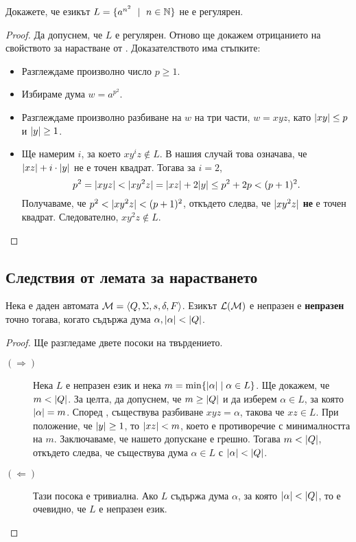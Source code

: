 \begin{problem}
  Докажете, че езикът $L = \{a^{n^2}\ \mid\ n\in\Nat\}$ не е регулярен.  
\end{problem}
\begin{proof}
  Да допуснем, че $L$ е регулярен. Отново ще докажем отрицанието на свойството за нарастване от .
  Доказателството има стъпките:
  \begin{itemize}
  \item 
    Разглеждаме произволно число $p \geq 1$.
  \item
    Избираме дума $w = a^{p^2}$.
  \item
    Разглеждаме произволно разбиване на $w$ на три части, $w = xyz$, 
    като $\lvert{xy}\rvert \leq p$ и $\lvert{y}\rvert \geq 1$.
  \item
    Ще намерим $i$, за което $xy^iz \not\in L$.
    В нашия случай това означава, че $\lvert{xz}\rvert + i\cdot\lvert{y}\rvert$ не е точен квадрат.
    Тогава за $i = 2$,
    \[p^2 = \lvert{xyz}\rvert < \lvert{xy^2z}\rvert = \lvert{xz}\rvert + 2\lvert{y}\rvert \leq p^2 + 2p < (p+1)^2 .\]
    Получаваме, че $p^2 < \lvert{xy^2z}\rvert < (p+1)^2$,
    откъдето следва, че $\lvert{xy^2z}\rvert$ {\bf не} е точен квадрат.    
    Следователно, $xy^2z \not\in L$.
  \end{itemize}
\end{proof}

\subsection{Следствия от лемата за нарастването}

\begin{prop}
  Нека е даден автомата $\mathcal{M} = \langle{Q,\Sigma,s,\delta,F}\rangle$.
  Езикът $\mathcal{L}(\mathcal{M})$ е непразен е {\bf непразен} точно тогава, когато съдържа дума $\alpha, \lvert{\alpha}\rvert < \lvert{Q}\rvert$.
\end{prop}
\begin{proof}
  Ще разгледаме двете посоки на твърдението.
  \begin{description}
  \item[$(\Rightarrow)$]
    Нека $L$ е непразен език и нека $m = \min\{\lvert{\alpha}\rvert \mid \alpha \in L\}$.
    Ще докажем, че $m < \lvert{Q}\rvert$.    
    За целта, да допуснем, че $m \geq \lvert{Q}\rvert$ и да изберем $\alpha \in L$, за която $\lvert{\alpha}\rvert = m$.
    Според , съществува разбиване $xyz = \alpha$, 
    такова че $xz \in L$.
    При положение, че $\lvert{y}\rvert \geq 1$, то $\lvert{xz}\rvert < m$, което 
    е противоречие с минималността на $m$.
    Заключаваме, че нашето допускане е грешно. Тогава $m < \lvert{Q}\rvert$, откъдето следва, че 
    съществува дума $\alpha \in L$ с $\lvert{\alpha}\rvert < \lvert{Q}\rvert$.
  \item[$(\Leftarrow)$]
    Тази посока е тривиална.
    Ако $L$ съдържа дума $\alpha$, за която $\lvert{\alpha}\rvert < \lvert{Q}\rvert$,
    то е очевидно, че $L$ е непразен език.
  \end{description}
\end{proof}

